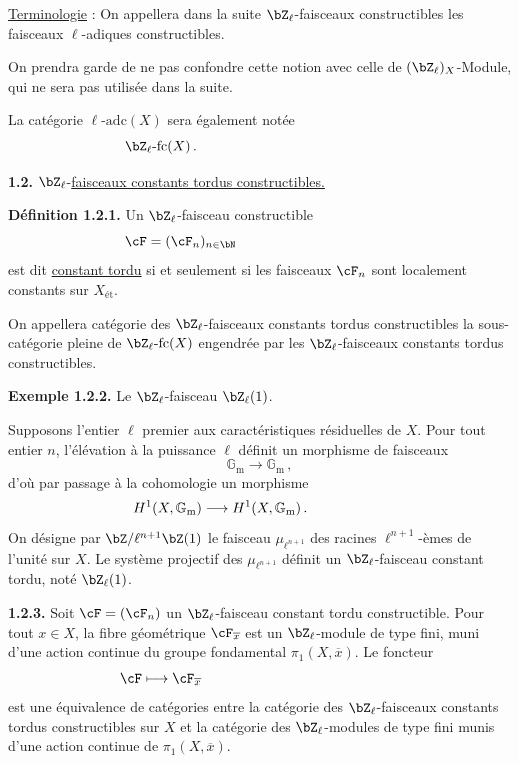 \smallskip
\noindent
\underline{Terminologie} : On appellera dans la suite $\bZ_{\ell}$-faisceaux constructibles les faisceaux $\ell$-adiques constructibles.

On prendra garde de ne pas confondre cette notion avec celle de $(\bZ_{\ell})_X$-Module, qui ne sera pas utilis\'ee dans la suite.

La cat\'egorie $\ell\text{-}\mathrm{adc}(X)$ sera \'egalement not\'ee
\[
\bZ_{\ell}\text{-}\mathrm{fc}(X)\,.\hspace*{5cm}
\]

\newpage

\noindent
\textbf{1.2.} $\bZ_{\ell}$-\underline{faisceaux constants tordus constructibles.}

\noindent
\textbf{D\'efinition 1.2.1.} Un $\bZ_{\ell}$-faisceau constructible
\[
\cF = (\cF_n)_{n \in \bN}\hspace*{4cm}
\]
est dit \underline{constant tordu} si et seulement si les faisceaux $\cF_n$ sont localement constants sur $X_{\text{\'et}}$.

On appellera cat\'egorie des $\bZ_{\ell}$-faisceaux constants tordus constructibles la sous-cat\'egorie pleine de $\bZ_{\ell}\text{-}\mathrm{fc}(X)$ engendr\'ee par les $\bZ_{\ell}$-faisceaux constants tordus constructibles.

\bigskip

\noindent
\textbf{Exemple 1.2.2.} Le $\bZ_{\ell}$-faisceau $\bZ_{\ell}(1)$.

Supposons l'entier $\ell$ premier aux caract\'eristiques r\'esiduelles de $X$. Pour tout entier $n$, l'\'el\'evation \`a la puissance $\ell$ d\'efinit un morphisme de faisceaux
\[
\mathbb{G}_{\mathrm{m}} \longrightarrow \mathbb{G}_{\mathrm{m}}\,,
\]
d'o\`u par passage \`a la cohomologie un morphisme
\[
H^1(X, \mathbb{G}_{\mathrm{m}}) \longrightarrow H^1(X, \mathbb{G}_{\mathrm{m}})\,.\hspace*{2cm}
\]
On d\'esigne par $\bZ/\ell^{n+1}\bZ(1)$ le faisceau $\mu_{\ell^{n+1}}$ des racines $\ell^{n+1}$-\`emes de l'unit\'e sur $X$. Le syst\`eme projectif des $\mu_{\ell^{n+1}}$ d\'efinit un $\bZ_{\ell}$-faisceau constant tordu, not\'e $\bZ_{\ell}(1)$.

\smallskip

\noindent
\textbf{1.2.3.} Soit $\cF = (\cF_n)$ un $\bZ_{\ell}$-faisceau constant tordu constructible. Pour tout $x \in X$, la fibre g\'eom\'etrique $\cF_{\overline{x}}$ est un $\bZ_{\ell}$-module de type fini, muni d'une action continue du groupe fondamental $\pi_1(X, \overline{x})$. Le foncteur
\[
\cF \longmapsto \cF_{\overline{x}}\hspace*{5cm}
\]
est une \'equivalence de cat\'egories entre la cat\'egorie des $\bZ_{\ell}$-faisceaux constants tordus constructibles sur $X$ et la cat\'egorie des $\bZ_{\ell}$-modules de type fini munis d'une action continue de $\pi_1(X, \overline{x})$.

